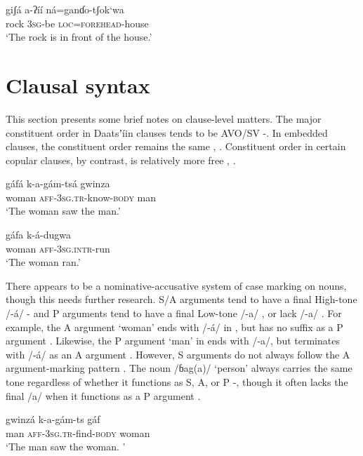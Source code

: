 \documentclass[output=paper]{langsci/langscibook}
\begin{document}
\ea\label{ex:ahlandc:65}
\gll
giʃ\'{a}   a-ʔ\'{i}\'{i}    n\'{a}=ganɗo-tʃok‘wa   \\ 
rock 3\textsc{sg}{}-be \textsc{loc}=\textsc{forehead}{}-house \\
\glt
‘The rock is in front of the house.’
\z

\section{Clausal syntax}\label{sec:ahlandc:11}

This section presents some brief notes on clause-level matters. The major constituent order in Daatsʼ\'{i}in clauses tends to be AVO/SV -. In embedded clauses, the constituent order remains the same , . Constituent order in certain copular clauses, by contrast, is relatively more free , .

\ea\label{ex:ahlandc:66}
\gll
g\'{a}f\'{a}      k-a-g\'{a}m-ts\'{a}    gwinza \\ 
woman \textsc{aff-3sg.tr}{}-know-\textsc{body}  man \\
\glt
‘The woman saw the man.’
\z

\ea\label{ex:ahlandc:67}
\gll
g\'{a}fa       k-\'{a}-dugwa \\
 woman \textsc{aff-3sg.intr}{}-run \\
\glt
‘The woman ran.’
\z

There appears to be a nominative-accusative system of case marking on nouns, though this needs further research. S/A arguments tend to have a final High-tone /-\'{a}/ - and P arguments tend to have a final Low-tone /-a/ ,  or lack /-a/ . For example, the A argument ‘woman’ ends with /-\'{a}/ in , but has no suffix as a P argument . Likewise, the P argument ‘man’ in  ends with /-a/, but terminates with /-\'{a}/ as an A argument . However, S arguments do not always follow the A argument-marking pattern . The noun /ɓag(a)/ ‘person’ always carries the same tone regardless of whether it functions as S, A, or P -, though it often lacks the final /a/ when it functions as a P argument . 

\ea\label{ex:ahlandc:68}
\gll
gwinz\'{a}  k-a-g\'{a}m-ts   g\'{a}f  \\
man  \textsc{aff-3sg.tr}{}-find-\textsc{body}  woman \\
\glt
‘The man saw the woman. ’
\z
\end{document}
